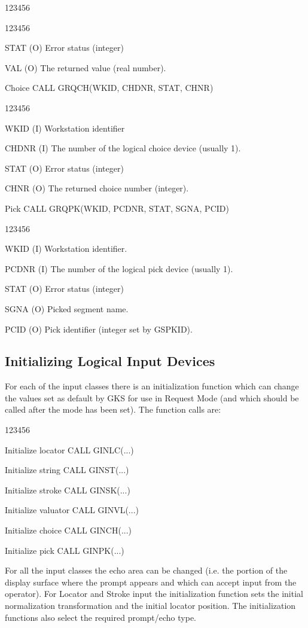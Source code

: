\begin{DLtt}{123456}
\begin{DLtt}{123456}
\item[STAT](O) Error status (integer)
\item[VAL](O) The returned value (real number).
\end{DLtt}
\item[Choice]CALL GRQCH(WKID, CHDNR, STAT, CHNR)
\begin{DLtt}{123456}
\item[WKID](I) Workstation identifier
\item[CHDNR](I) The number of the logical choice device (usually 1).
\item[STAT](O) Error status (integer)
\item[CHNR](O) The returned choice number (integer).
\end{DLtt}
\item[Pick]CALL GRQPK(WKID, PCDNR, STAT, SGNA, PCID)
\begin{DLtt}{123456}
\item[WKID](I) Workstation identifier.
\item[PCDNR](I) The number of the logical pick device (usually 1).
\item[STAT](O) Error status (integer)
\item[SGNA](O) Picked segment name.
\item[PCID](O) Pick identifier (integer set by GSPKID).
\end{DLtt}
\end{DLtt}
\subsection{Initializing Logical Input Devices}
 
For each of the input classes there is an initialization function which
can change the values set as default by GKS for use in Request Mode
(and which should be called after the mode has been set).
The function calls are:
\begin{DLtt}{123456}
\item[Initialize locator]CALL GINLC(...)
\item[Initialize string]CALL GINST(...)
\item[Initialize stroke]CALL GINSK(...)
\item[Initialize valuator]CALL GINVL(...)
\item[Initialize choice]CALL GINCH(...)
\item[Initialize pick]CALL GINPK(...)
\end{DLtt}
For all the input classes the echo area can be changed
(i.e. the portion of the display surface where the prompt appears and
which can accept input from the operator).
For Locator and Stroke input the initialization function sets the
initial normalization transformation and the initial locator position.
The initialization functions also select the required prompt/echo type.
 
